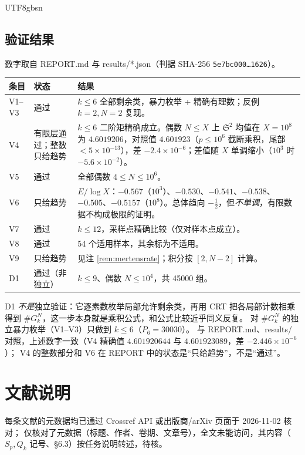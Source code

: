 \documentclass[11pt,a4paper]{article}
\newcommand{\Sing}{\mathfrak S}
\theoremstyle{plain}
\theoremstyle{definition}
\begin{document}
\begin{CJK}{UTF8}{gbsn}
\subsection*{验证结果}
数字取自 REPORT.md 与 results/*.json（判据 SHA-256 \texttt{5e7bc000\ldots1626}）。
\begin{center}
\begin{tabular}{p{1.6cm}p{2.6cm}p{10.2cm}}
\hline
条目 & 状态 & 结果\\
\hline
V1--V3 & 通过 & $k\le6$ 全部剩余类，暴力枚举 + 精确有理数；反例 $k=2,N=2$ 复现。\\
V4 & 有限层通过；整数只给趋势 & $k\le6$ 二阶矩精确成立。偶数 $N\le X$ 上 $\Sing^2$ 均值在 $X=10^8$ 为 $4.6019206$，对照值 $4.601923$（$p\le10^6$ 截断乘积，尾部 $<5\times10^{-13}$），差 $-2.4\times10^{-6}$；差值随 $X$ 单调缩小（$10^3$ 时 $-5.6\times10^{-2}$）。\\
V5 & 通过 & 全部偶数 $4\le N\le10^6$。\\
V6 & 只给趋势 & $E/\log X$：$-0.567$（$10^3$）、$-0.530$、$-0.541$、$-0.538$、$-0.505$、$-0.5157$（$10^8$）。总体趋向 $-\tfrac12$，但\emph{不单调}，有限数据不构成极限的证明。\\
V7 & 通过 & $k\le12$，采样点精确比较（仅对样本点成立）。\\
V8 & 通过 & 54 个适用样本，其余标为不适用。\\
V9 & 只给趋势 & 见注 \ref{rem:mertensrate}；积分按 $[2,N-2]$ 计算。\\
D1 & 通过（非独立） & $k\le9$、偶数 $N\le10^4$，共 45000 组。\\
\hline
\end{tabular}
\end{center}
D1 \emph{不是}独立验证：它逐素数枚举局部允许剩余类，再用 CRT 把各局部计数相乘得到 $\#G_k^N$，这一步本身就是乘积公式，和公式比较近乎同义反复。
对 $\#G_k^N$ 的独立暴力枚举（V1--V3）只做到 $k\le6$（$P_6=30030$）。
与 REPORT.md、results/ 对照，上述数字一致（V4 精确值 $4.601920644$ 与 $4.601923089$，差 $-2.446\times10^{-6}$）；
V4 的整数部分和 V6 在 REPORT 中的状态是“只给趋势”，不是“通过”。

\section*{文献说明}
每条文献的元数据均已通过 Crossref API 或出版商/arXiv 页面于 2026-11-02 核对；
\cite{Wang26} 仅核对了元数据（标题、作者、卷期、文章号），全文未能访问，其内容（$S_p,Q_k$ 记号、\S6.3）按任务说明转述，待核。


\end{CJK}
\end{document}
